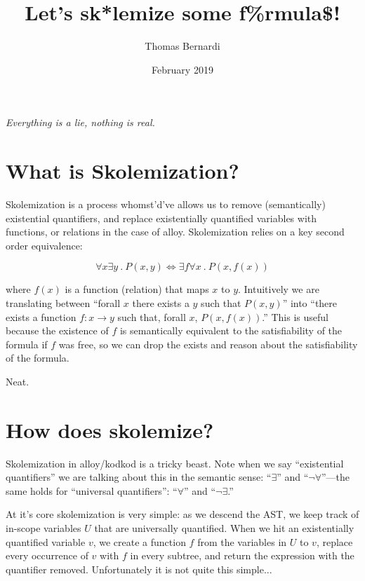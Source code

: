 \documentclass{article}
\title{Let's sk*lemize some f\%rmula\$!}
\date{February 2019}
\author{Thomas Bernardi}
\theoremstyle{definition}
\begin{document}
	\maketitle
	\begin{center}	
		\textit{Everything is a lie, nothing is real.} \\
    \end{center}

    \section{What is Skolemization?}

    Skolemization is a process whomst'd've allows us to remove (semantically) existential quantifiers, and replace existentially quantified variables with functions, or relations in the case of alloy. Skolemization relies on a key second order equivalence:

    $$\forall x \exists y~.~P(x, y) \Leftrightarrow \exists f \forall x~.~P(x, f(x))$$

    where $f(x)$ is a function (relation) that maps $x$ to $y$. Intuitively we are translating between ``forall $x$ there exists a $y$ such that $P(x, y)$'' into ``there exists a function $f : x \rightarrow y$ such that, forall $x$, $P(x, f(x))$.'' This is useful because the existence of $f$ is semantically equivalent to the satisfiability of the formula if $f$ was free, so we can drop the exists and reason about the satisfiability of the formula.

    Neat.

    \section{How does skolemize?}

    Skolemization in alloy/kodkod is a tricky beast. Note when we say ``existential quantifiers'' we are talking about this in the semantic sense: ``$\exists$'' and ``$\neg\forall$''---the same holds for ``universal quantifiers'': ``$\forall$'' and ``$\neg \exists$.''

    At it's core skolemization is very simple: as we descend the AST, we keep track of in-scope variables $U$ that are universally quantified. When we hit an existentially quantified variable $v$, we create a function $f$ from the variables in $U$ to $v$, replace every occurrence of $v$ with $f$ in every subtree, and return the expression with the quantifier removed. Unfortunately it is not quite this simple...
\end{document}
